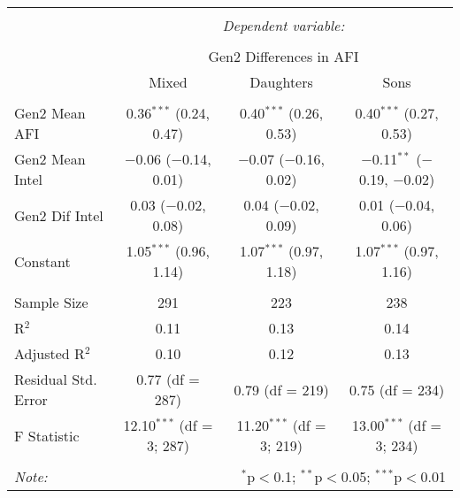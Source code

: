 
\begingroup 
\small 
\begin{tabular}{@{\extracolsep{1pt}}lccc} 
\\[-1.8ex]\hline 
\hline \\[-1.8ex] 
 & \multicolumn{3}{c}{\textit{Dependent variable:}} \\ 
\cline{2-4} 
\\[-1.8ex] & \multicolumn{3}{c}{Gen2 Differences in AFI} \\ 
 & Mixed & Daughters & Sons \\ 
\hline \\[-1.8ex] 
 Gen2 Mean AFI & 0.36$^{***}$ (0.24, 0.47) & 0.40$^{***}$ (0.26, 0.53) & 0.40$^{***}$ (0.27, 0.53) \\ 
  Gen2 Mean Intel & $-$0.06 ($-$0.14, 0.01) & $-$0.07 ($-$0.16, 0.02) & $-$0.11$^{**}$ ($-$0.19, $-$0.02) \\ 
  Gen2 Dif Intel & 0.03 ($-$0.02, 0.08) & 0.04 ($-$0.02, 0.09) & 0.01 ($-$0.04, 0.06) \\ 
  Constant & 1.05$^{***}$ (0.96, 1.14) & 1.07$^{***}$ (0.97, 1.18) & 1.07$^{***}$ (0.97, 1.16) \\ 
 \hline \\[-1.8ex] 
Sample Size & 291 & 223 & 238 \\ 
R$^{2}$ & 0.11 & 0.13 & 0.14 \\ 
Adjusted R$^{2}$ & 0.10 & 0.12 & 0.13 \\ 
Residual Std. Error & 0.77 (df = 287) & 0.79 (df = 219) & 0.75 (df = 234) \\ 
F Statistic & 12.10$^{***}$ (df = 3; 287) & 11.20$^{***}$ (df = 3; 219) & 13.00$^{***}$ (df = 3; 234) \\ 
\hline 
\hline \\[-1.8ex] 
\textit{Note:}  & \multicolumn{3}{r}{$^{*}$p$<$0.1; $^{**}$p$<$0.05; $^{***}$p$<$0.01} \\ 
\end{tabular} 
\endgroup 
